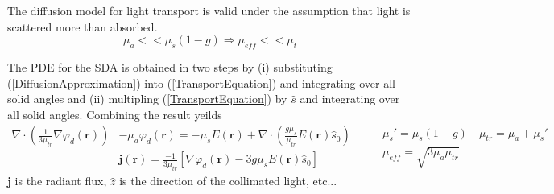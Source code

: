 \documentclass{article}         %
\theoremstyle{definition}
\theoremstyle{remark}
\newcommand{\eqn}[1]{(\ref{#1})}
\begin{document}
The diffusion model for light transport is valid under the assumption
that light is scattered more than absorbed.
\[
\mu_a << \mu_s(1-g)  \Rightarrow \mu_{eff} << \mu_t
\]

The PDE for the SDA is obtained in two steps by (i) substituting \eqn{DiffusionApproximation}
into \eqn{TransportEquation} and integrating over all solid angles and (ii)
multipling \eqn{TransportEquation}  by $\hat{s}$ and integrating over all
solid angles. Combining the result yeilds
\[ \begin{split}
\nabla\cdot \left( \frac{1}{3 \mu_{tr} } \nabla \varphi_d(\mathbf{r}) \right)  & - \mu_a \varphi_d(\mathbf{r}) 
= 
- \mu_s E(\mathbf{r})
+ \nabla  \cdot  \left( \frac{g \mu_s }{\mu_{tr}} E(\mathbf{r})  \hat{s}_0 \right) 
\\
& \mathbf{j}(\mathbf{r}) = \frac{-1}{3 \mu_{tr}} 
\left[
 \nabla \varphi_d(\mathbf{r}) - 3 g \mu_s E(\mathbf{r}) \hat{s}_0
\right]
\end{split}
\qquad
\begin{split}
\mu_s' = \mu_s (1-g)
\quad
\mu_{tr} = \mu_a + \mu_s'
\\
\mu_{eff} = \sqrt{3\mu_a  \mu_{tr}}
\end{split}
\]
$\mathbf{j}$ is the radiant flux, $\hat{z}$ is the direction of the collimated light, etc...
\end{document}
